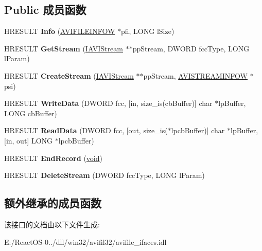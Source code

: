 \subsection*{Public 成员函数}
\begin{DoxyCompactItemize}
\item 
\mbox{\label{interface_i_a_v_i_file_a516011bab475a0613b8d2a709ad9401b}} 
H\+R\+E\+S\+U\+LT {\bfseries Info} (\hyperlink{struct___a_v_i_f_i_l_e_i_n_f_o_w}{A\+V\+I\+F\+I\+L\+E\+I\+N\+F\+OW} $\ast$pfi, L\+O\+NG l\+Size)
\item 
\mbox{\label{interface_i_a_v_i_file_a70aa38df75ed5ed55f169ecc5551aa6a}} 
H\+R\+E\+S\+U\+LT {\bfseries Get\+Stream} (\hyperlink{interface_i_a_v_i_stream}{I\+A\+V\+I\+Stream} $\ast$$\ast$pp\+Stream, D\+W\+O\+RD fcc\+Type, L\+O\+NG l\+Param)
\item 
\mbox{\label{interface_i_a_v_i_file_ade00ccf6ae18216b13ac4772a787fc05}} 
H\+R\+E\+S\+U\+LT {\bfseries Create\+Stream} (\hyperlink{interface_i_a_v_i_stream}{I\+A\+V\+I\+Stream} $\ast$$\ast$pp\+Stream, \hyperlink{struct___a_v_i_s_t_r_e_a_m_i_n_f_o_w}{A\+V\+I\+S\+T\+R\+E\+A\+M\+I\+N\+F\+OW} $\ast$psi)
\item 
\mbox{\label{interface_i_a_v_i_file_a125a69254912f302150be90a673b926f}} 
H\+R\+E\+S\+U\+LT {\bfseries Write\+Data} (D\+W\+O\+RD fcc, \mbox{[}in, size\+\_\+is(cb\+Buffer)\mbox{]} char $\ast$lp\+Buffer, L\+O\+NG cb\+Buffer)
\item 
\mbox{\label{interface_i_a_v_i_file_a2c2bf3a006ee788b20457d02e31a5d50}} 
H\+R\+E\+S\+U\+LT {\bfseries Read\+Data} (D\+W\+O\+RD fcc, \mbox{[}out, size\+\_\+is($\ast$lpcb\+Buffer)\mbox{]} char $\ast$lp\+Buffer, \mbox{[}in, out\mbox{]} L\+O\+NG $\ast$lpcb\+Buffer)
\item 
\mbox{\label{interface_i_a_v_i_file_ab53a9dd497a8b86944afd5b75a6e4056}} 
H\+R\+E\+S\+U\+LT {\bfseries End\+Record} (\hyperlink{interfacevoid}{void})
\item 
\mbox{\label{interface_i_a_v_i_file_a914588b24ad00f0afd9ae776ea8d340b}} 
H\+R\+E\+S\+U\+LT {\bfseries Delete\+Stream} (D\+W\+O\+RD fcc\+Type, L\+O\+NG l\+Param)
\end{DoxyCompactItemize}
\subsection*{额外继承的成员函数}


该接口的文档由以下文件生成\+:\begin{DoxyCompactItemize}
\item 
E\+:/\+React\+O\+S-\/0../dll/win32/avifil32/avifile\+\_\+ifaces.\+idl\end{DoxyCompactItemize}

